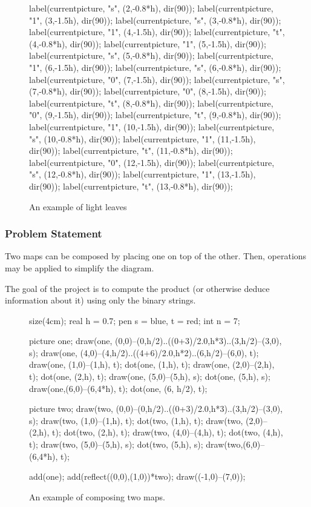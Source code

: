 \documentclass[pdf]{beamer}
\theoremstyle{definition}
\begin{document}
\begin{frame}[fragile]
\begin{figure}[ht]
\begin{asy}
		label(currentpicture, "s", (2,-0.8*h), dir(90));
		label(currentpicture, "1", (3,-1.5h), dir(90));
		label(currentpicture, "s", (3,-0.8*h), dir(90));
		label(currentpicture, "1", (4,-1.5h), dir(90));
		label(currentpicture, "t", (4,-0.8*h), dir(90));
		label(currentpicture, "1", (5,-1.5h), dir(90));
		label(currentpicture, "s", (5,-0.8*h), dir(90));
		label(currentpicture, "1", (6,-1.5h), dir(90));
		label(currentpicture, "s", (6,-0.8*h), dir(90));
		label(currentpicture, "0", (7,-1.5h), dir(90));
		label(currentpicture, "s", (7,-0.8*h), dir(90));
		label(currentpicture, "0", (8,-1.5h), dir(90));
		label(currentpicture, "t", (8,-0.8*h), dir(90));
		label(currentpicture, "0", (9,-1.5h), dir(90));
		label(currentpicture, "t", (9,-0.8*h), dir(90));
		label(currentpicture, "1", (10,-1.5h), dir(90));
		label(currentpicture, "s", (10,-0.8*h), dir(90));
		label(currentpicture, "1", (11,-1.5h), dir(90));
		label(currentpicture, "t", (11,-0.8*h), dir(90));
		label(currentpicture, "0", (12,-1.5h), dir(90));
		label(currentpicture, "s", (12,-0.8*h), dir(90));
		label(currentpicture, "1", (13,-1.5h), dir(90));
		label(currentpicture, "t", (13,-0.8*h), dir(90));
		\end{asy}
		\caption{An example of light leaves}
	\end{figure}
\end{frame}

\begin{frame}[fragile]
	\frametitle{Problem Statement}
	Two maps can be composed by placing one on top of the other.  Then, operations may be applied to simplify the diagram.

	The goal of the project is to \alert{compute the product} (or otherwise deduce information about it) using \alert{only the binary strings}.
	\begin{figure}[ht]
		\centering
		\begin{asy}
		size(4cm);
		real h = 0.7;
		pen s = blue, t = red;
		int n = 7;

		picture one;
		draw(one, (0,0)--(0,h/2)..((0+3)/2.0,h*3)..(3,h/2)--(3,0), s);
		draw(one, (4,0)--(4,h/2)..((4+6)/2.0,h*2)..(6,h/2)--(6,0), t);
		draw(one, (1,0)--(1,h), t);
		dot(one, (1,h), t);
		draw(one, (2,0)--(2,h), t);
		dot(one, (2,h), t);
		draw(one, (5,0)--(5,h), s);
		dot(one, (5,h), s);
		draw(one,(6,0)--(6,4*h), t);
		dot(one, (6, h/2), t);

		picture two;
		draw(two, (0,0)--(0,h/2)..((0+3)/2.0,h*3)..(3,h/2)--(3,0), s);
		draw(two, (1,0)--(1,h), t);
		dot(two, (1,h), t);
		draw(two, (2,0)--(2,h), t);
		dot(two, (2,h), t);
		draw(two, (4,0)--(4,h), t);
		dot(two, (4,h), t);
		draw(two, (5,0)--(5,h), s);
		dot(two, (5,h), s);
		draw(two,(6,0)--(6,4*h), t);

		add(one); add(reflect((0,0),(1,0))*two);
		draw((-1,0)--(7,0));
		\end{asy}
		\caption{An example of composing two maps.}
	\end{figure}
\end{frame}
\end{document}
